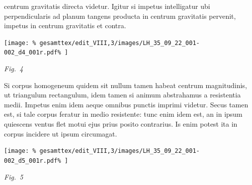 %
centrum gravitatis\protect{} directa
%
%
%
videtur.
\pend
%
\pstart
Igitur
%
si impetus\protect{}
%
%
intelligatur 
%
ubi perpendicularis ad planum tangens producta in centrum gravitatis\protect{}
%
pervenit, impetus\protect{} in centrum gravitatis\protect{} 
%
%
et contra.\pend 
%
\vspace{1.0em} %
\centerline{%
\texttt{[image: \%
gesamttex/edit\_VIII,3/images/LH\_35\_09\_22\_001-002\_d4\_001r.pdf\%
]}} 
\vspace{0.5em}
\centerline{%
\lbrack\textit{Fig.~4}\rbrack%
}
\vspace{1em}
%
\pstart
Si corpus homogeneum%
\protect{}
%
 quidem sit nullum tamen habeat centrum magnitudinis,%
\protect{}
%
 ut triangulum rectangulum, idem tamen
%
%
si animum abstrahamus a resistentia medii\protect{}. Impetus\protect{} 
%
enim idem aeque omnibus punctis imprimi videtur.
\pend
%
\pstart
Secus tamen est, si tale corpus feratur in medio resistente\lbrack:\rbrack%
\protect{}
%
tunc enim idem est, an in ipsum quiescens
%
ventus%
\protect{}
%
 flet motui ejus prius posito contrarius. Is enim potest ita in corpus incidere ut ipsum circumagat. 
\pend 
%
\vspace{1.0em} %
\centerline{%
\texttt{[image: \%
gesamttex/edit\_VIII,3/images/LH\_35\_09\_22\_001-002\_d5\_001r.pdf\%
]}} 
\vspace{0.5em}
\centerline{%
\lbrack\textit{Fig.~5}\rbrack%
}
